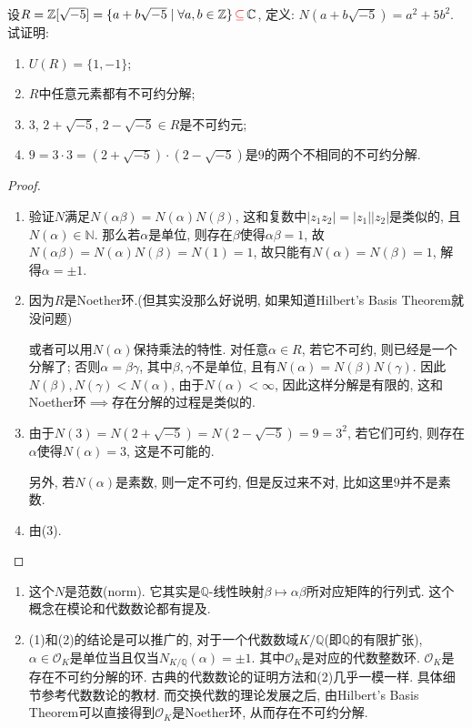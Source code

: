 \documentclass{../solutions-cn}
\begin{document}
\begin{exercise}[习题2.2.5]
    设$R = \mathbb{Z}[\sqrt{-5}] = \{a + b\sqrt{-5} \mid \forall a, b \in\mathbb{Z}\} \,\textcolor{red}{\subseteq}\, \mathbb{C}$, 定义: $N(a + b\sqrt{-5}) = a^2 + 5b^2$. 试证明:
    \begin{enumerate}[(1)]
        \item $U(R) = \{1, -1\}$;
        \item $R$中任意元素都有不可约分解;
        \item $3$, $2 + \sqrt{-5}$, $2 - \sqrt{-5} \in R$是不可约元;
        \item $9 = 3 \cdot 3= (2 + \sqrt{-5}) \cdot (2 - \sqrt{-5})$是$9$的两个不相同的不可约分解.
    \end{enumerate}
\end{exercise}

\begin{proof}
    \begin{enumerate}[(1)]
        \item 验证$N$满足$N(\alpha\beta) = N(\alpha)N(\beta)$, 这和复数中$|z_1z_2| = |z_1||z_2|$是类似的, 且$N(\alpha) \in \mathbb{N}$. 那么若$\alpha$是单位, 则存在$\beta$使得$\alpha\beta = 1$, 故$N(\alpha\beta) = N(\alpha)N(\beta) = N(1) = 1$, 故只能有$N(\alpha) = N(\beta) = 1$, 解得$\alpha = \pm 1$.
        \item 因为$R$是Noether环.(但其实没那么好说明, 如果知道Hilbert's Basis Theorem就没问题)
    
        或者可以用$N(\alpha)$保持乘法的特性. 对任意$\alpha \in R$, 若它不可约, 则已经是一个分解了; 否则$\alpha = \beta\gamma$, 其中$\beta, \gamma$不是单位, 且有$N(\alpha) = N(\beta)N(\gamma)$. 因此$N(\beta), N(\gamma) < N(\alpha)$, 由于$N(\alpha) < \infty$, 因此这样分解是有限的, 这和Noether环$\implies$存在分解的过程是类似的.
        \item 由于$N(3) = N(2 + \sqrt{-5}) = N(2 - \sqrt{-5}) = 9 = 3^2$, 若它们可约, 则存在$\alpha$使得$N(\alpha) = 3$, 这是不可能的.
    
        另外, 若$N(\alpha)$是素数, 则一定不可约, 但是反过来不对, 比如这里$9$并不是素数.
        \item 由(3).
    \end{enumerate}
\end{proof}

\begin{remark}
    \begin{enumerate}[1.]
        \item 这个$N$是范数(norm). 它其实是$\mathbb{Q}$-线性映射$\beta \mapsto \alpha\beta$所对应矩阵的行列式. 这个概念在模论和代数数论都有提及.
        \item (1)和(2)的结论是可以推广的, 对于一个代数数域$K/\mathbb{Q}$(即$\mathbb{Q}$的有限扩张), $\alpha \in \mathcal{O}_K$是单位当且仅当$N_{K/\mathbb{Q}}(\alpha) = \pm1$. 其中$\mathcal{O}_K$是对应的代数整数环. $\mathcal{O}_K$是存在不可约分解的环. 古典的代数数论的证明方法和(2)几乎一模一样. 具体细节参考代数数论的教材. 而交换代数的理论发展之后, 由Hilbert's Basis Theorem可以直接得到$\mathcal{O}_K$是Noether环, 从而存在不可约分解.
    \end{enumerate}
\end{remark}
\end{document}
